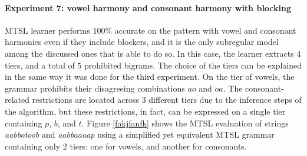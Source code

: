 \begin{table}[h!]
\centering
{}
\caption{MTSL learning of vowel and consonant harmonies w/o blockers; abstract representation.}
\end{table}


\paragraph{Experiment 7: vowel harmony and consonant harmony with blocking}

MTSL learner performs $100$\% accurate on the pattern with vowel and consonant harmonies even if they include blockers, and it is the only subregular model among the discussed ones that is able to do so.
In this case, the learner extracts $4$ tiers, and a total of $5$ prohibited bigrams.
The choice of the tiers can be explained in the same way it was done for the third experiment.
On the tier of vowels, the grammar prohibits their disagreeing combinations $ao$ and $oa$.
The consonant-related restrictions are located across $3$ different tiers due to the inference steps of the algorithm, but these restrictions, in fact, can be expressed on a single tier containing $p$, $b$, and $t$.
Figure \ref{fakjfanfk} shows the MTSL evaluation of strings \emph{aabbotoob} and \emph{aabbaaaap} using a simplified yet equivalent MTSL grammar containing only $2$ tiers: one for vowels, and another for consonants.

